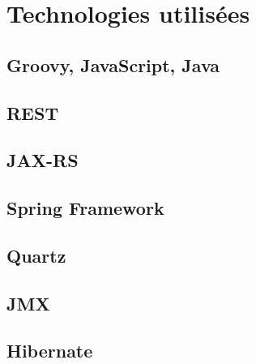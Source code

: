 \documentclass{article}
\begin{document}
\title{}
\author{François-Xavier Guillemette}
\maketitle

\begin{abstract}

\end{abstract}

\pagebreak
\tableofcontents
\pagebreak

\section{Technologies utilisées} %
\label{sec:technologies_utilisees}

\subsection{Groovy, JavaScript, Java} %
\label{sub:groovy}

\subsection{REST} %
\label{sub:rest}

\subsection{JAX-RS} %
\label{sub:jax_rs}

\subsection{Spring Framework} %
\label{sub:spring_framework}

\subsection{Quartz} %
\label{sub:quartz}

\subsection{JMX} %
\label{sub:jmx}

\subsection{Hibernate} %
\label{sub:hibernate}
\end{document}

